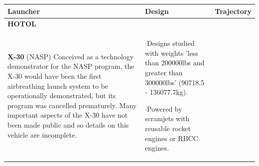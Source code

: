 \begin{xltabular}{\linewidth}{|X|X|X|}
\hline \small  \textbf{Launcher} &\small \textbf{Design} &\small \textbf{Trajectory}\\ 
\hline \small \textbf{HOTOL}
& \small
& \small
\\
\hline \small \textbf{X-30} (NASP)\cite{NASP} \newline \newline Conceived as a technology demonstrator for the NASP program, the X-30 would have been the first airbreathing launch system to be operationally demonstrated, but its program was cancelled prematurely. Many important aspects of the X-30 have not been made public\cite{NASP} and so details on this vehicle are incomplete.   
&\small
{} 

$\cdot$Designs studied with weights 'less than 200000lbs and greater than 300000lbs'\cite{NASP} (90718.5 - 136077.7kg).

$\cdot$Powered by scramjets with reusable rocket engines or RBCC engines.

&\small
{} 


\end{xltabular}
